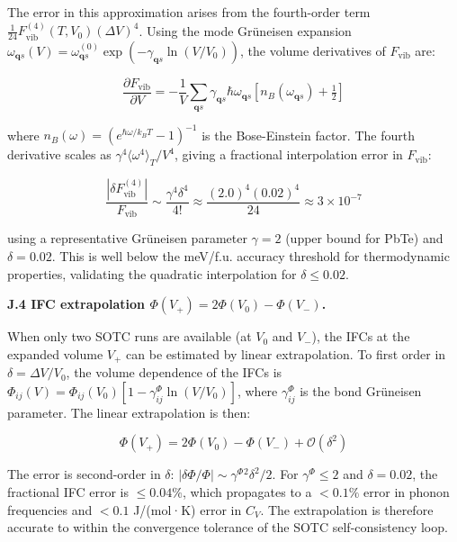 \documentclass[aps,prb,reprint,amsmath,amssymb,floatfix]{revtex4-2}
\begin{document}
The error in this approximation arises from the fourth-order term
\(\frac{1}{24}F_\text{vib}^{(4)}(T,V_0)(\Delta V)^4\). Using the mode
Grüneisen expansion
\(\omega_{\mathbf{q}s}(V) = \omega_{\mathbf{q}s}^{(0)}\exp(-\gamma_{\mathbf{q}s}\ln(V/V_0))\),
the volume derivatives of \(F_\text{vib}\) are:

\begin{equation*}
\frac{\partial F_\text{vib}}{\partial V} = -\frac{1}{V}\sum_{\mathbf{q}s}\gamma_{\mathbf{q}s}\hbar\omega_{\mathbf{q}s}\left[n_B(\omega_{\mathbf{q}s}) + \tfrac{1}{2}\right]
\end{equation*}

where \(n_B(\omega) = (e^{\hbar\omega/k_BT}-1)^{-1}\) is the
Bose-Einstein factor. The fourth derivative scales as
\(\gamma^4\langle\omega^4\rangle_T/V^4\), giving a fractional
interpolation error in \(F_\text{vib}\):

\begin{equation*}
\frac{\left|\delta F_\text{vib}^{(4)}\right|}{F_\text{vib}} \sim \frac{\gamma^4\delta^4}{4!} \approx \frac{(2.0)^4(0.02)^4}{24} \approx 3\times10^{-7}
\end{equation*}

using a representative Grüneisen parameter \(\gamma = 2\) (upper bound
for PbTe) and \(\delta = 0.02\). This is well below the meV/f.u.
accuracy threshold for thermodynamic properties, validating the
quadratic interpolation for \(\delta \leq 0.02\).

\textbf{J.4 IFC extrapolation \(\Phi(V_+) = 2\Phi(V_0) - \Phi(V_-)\).}

When only two SOTC runs are available (at \(V_0\) and \(V_-\)), the IFCs
at the expanded volume \(V_+\) can be estimated by linear extrapolation.
To first order in \(\delta = \Delta V/V_0\), the volume dependence of
the IFCs is
\(\Phi_{ij}(V) = \Phi_{ij}(V_0)[1 - \gamma_{ij}^\Phi\ln(V/V_0)]\), where
\(\gamma_{ij}^\Phi\) is the bond Grüneisen parameter. The linear
extrapolation is then:

\begin{equation*}
\Phi(V_+) = 2\Phi(V_0) - \Phi(V_-) + \mathcal{O}(\delta^2)
\end{equation*}

The error is second-order in \(\delta\):
\(|\delta\Phi/\Phi| \sim \gamma^\Phi{}^2 \delta^2/2\). For
\(\gamma^\Phi \leq 2\) and \(\delta = 0.02\), the fractional IFC error
is \(\leq 0.04\%\), which propagates to a \(< 0.1\%\) error in phonon
frequencies and \(< 0.1\) J/(mol·K) error in \(C_V\). The extrapolation
is therefore accurate to within the convergence tolerance of the SOTC
self-consistency loop.
\end{document}
